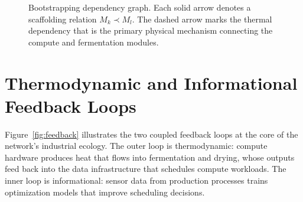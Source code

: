 \documentclass[12pt]{book}
\theoremstyle{definition}
\theoremstyle{remark}
\begin{document}
\begin{figure}[ht]
\centering
{}
\caption{Bootstrapping dependency graph. Each solid arrow denotes
  a scaffolding relation $M_k \prec M_l$. The dashed arrow marks
  the thermal dependency that is the primary physical mechanism
  connecting the compute and fermentation modules.}
\label{fig:bootstrap}
\end{figure}

\section{Thermodynamic and Informational Feedback Loops}

Figure~\ref{fig:feedback} illustrates the two coupled feedback loops
at the core of the network's industrial ecology. The outer loop is
thermodynamic: compute hardware produces heat that flows into
fermentation and drying, whose outputs feed back into the data
infrastructure that schedules compute workloads. The inner loop is
informational: sensor data from production processes trains
optimization models that improve scheduling decisions.
\end{document}
